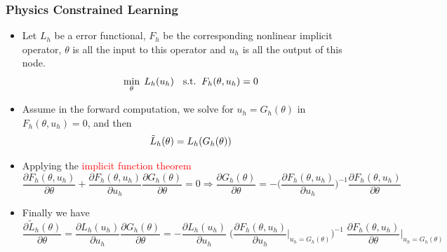 \documentclass{beamer}
\begin{document}
\begin{frame}
	\frametitle{Physics Constrained Learning}
	\begin{itemize}
		\item Let $L_h$ be a error functional, $F_h$ be the corresponding nonlinear implicit operator, $\theta$ is all the input to this operator and $u_h$ is all the output of this node.
 $${\small    \min_{\theta}\; L_h(u_h) \quad \mathrm{s.t.}\;\; F_h(\theta, u_h) = 0}$$

\item Assume in the forward computation, we solve for $u_h=G_h(\theta)$ in $F_h(\theta, u_h)=0$, and then
$${\small\tilde L_h(\theta)  = L_h(G_h(\theta))}$$
\item Applying the \textcolor{red}{implicit function theorem}
{  \scriptsize
\begin{equation*}
\frac{{\partial {F_h(\theta, u_h)}}}{{\partial \theta }} + {\frac{{\partial {F_h(\theta, u_h)}}}{{\partial {u_h}}}}  \frac{\partial G_h(\theta)}{\partial \theta} = 0  \Rightarrow 
     \frac{\partial G_h(\theta)}{\partial \theta} =  -\Big( \frac{{\partial {F_h(\theta, u_h)}}}{{\partial {u_h}}} \Big)^{ - 1} \frac{{\partial {F_h(\theta, u_h)}}}{{\partial \theta }}
\end{equation*}
}
\item Finally we have
{\scriptsize
\begin{equation*}
    \boxed{\frac{{\partial {{\tilde L}_h}(\theta )}}{{\partial \theta }} 
    = \frac{\partial {{ L}_h}(u_h )}{\partial u_h}\frac{\partial G_h(\theta)}{\partial \theta}= - \frac{{\partial {L_h}({u_h})}}{{\partial {u_h}}} \;
    \Big( {\frac{{\partial {F_h(\theta, u_h)}}}{{\partial {u_h}}}\Big|_{u_h = {G_h}(\theta )}} \Big)^{ - 1} \;
    \frac{{\partial {F_h(\theta, u_h)}}}{{\partial \theta }}\Big|_{u_h = {G_h}(\theta )}}
\end{equation*}
}

	\end{itemize}
	
\end{frame}
\end{document}
